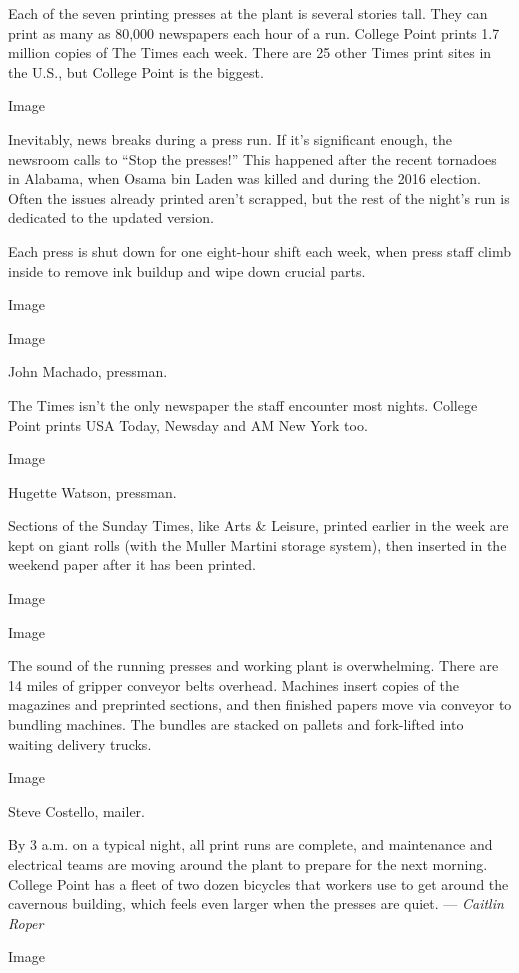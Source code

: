 Each of the seven printing presses at the plant is several stories tall.
They can print as many as 80,000 newspapers each hour of a run. College
Point prints 1.7 million copies of The Times each week. There are 25
other Times print sites in the U.S., but College Point is the biggest.

Image

Inevitably, news breaks during a press run. If it's significant enough,
the newsroom calls to ``Stop the presses!'' This happened after the
recent tornadoes in Alabama, when Osama bin Laden was killed and during
the 2016 election. Often the issues already printed aren't scrapped, but
the rest of the night's run is dedicated to the updated version.

Each press is shut down for one eight-hour shift each week, when press
staff climb inside to remove ink buildup and wipe down crucial parts.

Image

Image

John Machado, pressman.

The Times isn't the only newspaper the staff encounter most nights.
College Point prints USA Today, Newsday and AM New York too.

Image

Hugette Watson, pressman.

Sections of the Sunday Times, like Arts \& Leisure, printed earlier in
the week are kept on giant rolls (with the Muller Martini storage
system), then inserted in the weekend paper after it has been printed.

Image

Image

The sound of the running presses and working plant is overwhelming.
There are 14 miles of gripper conveyor belts overhead. Machines insert
copies of the magazines and preprinted sections, and then finished
papers move via conveyor to bundling machines. The bundles are stacked
on pallets and fork-lifted into waiting delivery trucks.

Image

Steve Costello, mailer.

By 3 a.m. on a typical night, all print runs are complete, and
maintenance and electrical teams are moving around the plant to prepare
for the next morning. College Point has a fleet of two dozen bicycles
that workers use to get around the cavernous building, which feels even
larger when the presses are quiet. --- \emph{Caitlin Roper}

Image

